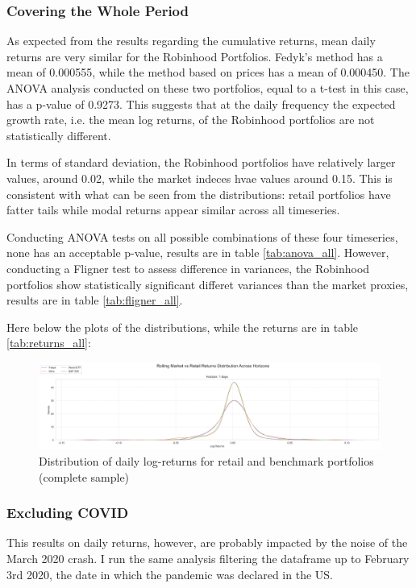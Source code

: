 \subsubsection{Covering the Whole Period}
As expected from the results regarding the cumulative returns, mean daily returns are very similar for the Robinhood Portfolios.
Fedyk's method has a mean of 0.000555, while the method based on prices has a mean of 0.000450.
The ANOVA analysis conducted on these two portfolios, equal to a t-test in this case, has a p-value of 0.9273.
This suggests that at the daily frequency the expected growth rate, i.e. the mean log returns, of the Robinhood portfolios are not statistically different.


In terms of standard deviation, the Robinhood portfolios have relatively larger values, around 0.02, while the market indeces hvae values around 0.15. 
This is consistent with what can be seen from the distributions: retail portfolios have fatter tails while modal returns appear similar across all timeseries.

Conducting ANOVA tests on all possible combinations of these four timeseries, none has an acceptable p-value, results are in table \ref{tab:anova_all}.
However, conducting a Fligner test to assess difference in variances, the Robinhood portfolios show statistically significant differet variances than the market proxies, results are in table \ref{tab:fligner_all}.


Here below the plots of the distributions, while the returns are in table \ref{tab:returns_all}:
\begin{figure}[h!]
    \centering
    \includegraphics[width=1\linewidth]
    {../images/distributions/st_all.png}
    \caption{Distribution of daily log-returns for retail and benchmark portfolios (complete sample)}
\end{figure}


\subsubsection{Excluding COVID}
This results on daily returns, however, are probably impacted by the noise of the March 2020 crash. 
I run the same analysis filtering the dataframe up to February 3rd 2020, the date in which the pandemic was declared in the US.

